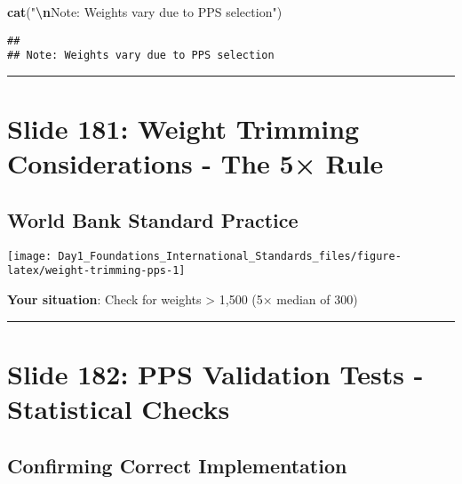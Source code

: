 \documentclass[
]{article}
\newenvironment{Shaded}{\begin{snugshade}}{\end{snugshade}}
\newcommand{\FunctionTok}[1]{\textcolor[rgb]{0.13,0.29,0.53}{\textbf{#1}}}
\newcommand{\NormalTok}[1]{#1}
\newcommand{\SpecialCharTok}[1]{\textcolor[rgb]{0.81,0.36,0.00}{\textbf{#1}}}
\newcommand{\StringTok}[1]{\textcolor[rgb]{0.31,0.60,0.02}{#1}}
\begin{document}
\begin{Shaded}
\begin{Highlighting}[]
\FunctionTok{cat}\NormalTok{(}\StringTok{"}\SpecialCharTok{\textbackslash{}n}\StringTok{Note: Weights vary due to PPS selection"}\NormalTok{)}
\end{Highlighting}
\end{Shaded}

\begin{verbatim}
## 
## Note: Weights vary due to PPS selection
\end{verbatim}

\begin{center}\rule{0.5\linewidth}{0.5pt}\end{center}

\section{Slide 181: Weight Trimming Considerations - The 5×
Rule}\label{slide-181-weight-trimming-considerations---the-5-rule}

\subsection{World Bank Standard
Practice}\label{world-bank-standard-practice}

\texttt{[image: Day1\_Foundations\_International\_Standards\_files/figure-latex/weight-trimming-pps-1]}

\textbf{Your situation}: Check for weights \textgreater{} 1,500 (5×
median of 300)

\begin{center}\rule{0.5\linewidth}{0.5pt}\end{center}

\section{Slide 182: PPS Validation Tests - Statistical
Checks}\label{slide-182-pps-validation-tests---statistical-checks}

\subsection{Confirming Correct
Implementation}\label{confirming-correct-implementation}
\end{document}
